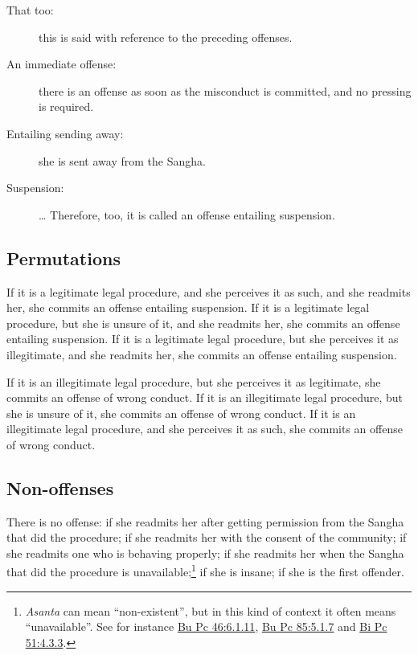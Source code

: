 \documentclass[12pt,openany]{book}%
\begin{document}
\begin{description}
\item[That too: ] this is said with reference to the preceding offenses. %
\item[An immediate offense: ] there is an offense as soon as the misconduct is committed, and no pressing is required. %
\item[Entailing sending away: ] she is sent away from the Sangha. %
\item[Suspension: ] … Therefore, too, it is called an offense entailing suspension. %
\end{description}

\subsection*{Permutations }

If it is a legitimate legal procedure, and she perceives it as such, and she readmits her, she commits an offense entailing suspension. If it is a legitimate legal procedure, but she is unsure of it, and she readmits her, she commits an offense entailing suspension. If it is a legitimate legal procedure, but she perceives it as illegitimate, and she readmits her, she commits an offense entailing suspension. 

If it is an illegitimate legal procedure, but she perceives it as legitimate, she commits an offense of wrong conduct. If it is an illegitimate legal procedure, but she is unsure of it, she commits an offense of wrong conduct. If it is an illegitimate legal procedure, and she perceives it as such, she commits an offense of wrong conduct. 

\subsection*{Non-offenses }

There is no offense: if she readmits her after getting permission from the Sangha that did the procedure;  if she readmits her with the consent of the community;  if she readmits one who is behaving properly;  if she readmits her when the Sangha that did the procedure is unavailable;\footnote{\textit{Asanta} can mean “non-existent”, but in this kind of context it often means “unavailable”. See for instance \href{https://suttacentral.net/pli-tv-bu-vb-pc46/en/brahmali\#6.1.11}{Bu Pc 46:6.1.11}, \href{https://suttacentral.net/pli-tv-bu-vb-pc85/en/brahmali\#5.1.7}{Bu Pc 85:5.1.7} and \href{https://suttacentral.net/pli-tv-bi-vb-pc51/en/brahmali\#4.3.3}{Bi Pc 51:4.3.3}. }  if she is insane;  if she is the first offender. 
\end{document}

